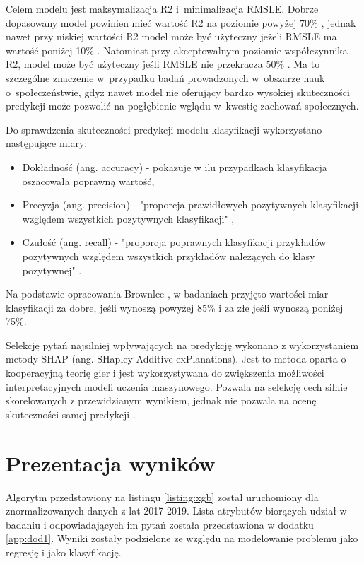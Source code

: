 Celem modelu jest maksymalizacja R2 i~minimalizacja RMSLE. Dobrze dopasowany model powinien mieć wartość R2 na poziomie powyżej 70\% \cite{r2-good-value}, jednak nawet przy niskiej wartości R2 model może być użyteczny jeżeli RMSLE ma wartość poniżej 10\% \cite{r2-vs-rmse}.
Natomiast przy akceptowalnym poziomie współczynnika R2, model może być użyteczny jeśli RMSLE nie przekracza 50\% \cite{rmse-good-value}.
Ma to szczególne znaczenie w~przypadku badań prowadzonych w~obszarze nauk o~społeczeństwie, gdyż nawet model nie oferujący bardzo wysokiej skuteczności predykcji może pozwolić na pogłębienie wglądu w~kwestię zachowań społecznych.

Do sprawdzenia skuteczności predykcji modelu klasyfikacji wykorzystano następujące miary:
\begin{itemize}
    \item Dokładność (ang. accuracy) - pokazuje w ilu przypadkach klasyfikacja oszacowała poprawną wartość,
    \item Precyzja (ang. precision) - "proporcja prawidłowych pozytywnych klasyfikacji względem wszystkich pozytywnych klasyfikacji" \cite{recall-precision},
    \item Czułość (ang. recall) - "proporcja poprawnych klasyfikacji przykładów pozytywnych względem wszystkich przykładów należących do klasy pozytywnej" \cite{recall-precision}.
\end{itemize}

Na podstawie opracowania Brownlee \cite{accuracy-level}, w badaniach przyjęto wartości miar klasyfikacji za dobre, jeśli wynoszą powyżej 85\% i za złe jeśli wynoszą poniżej 75\%.

Selekcję pytań najsilniej wpływających na predykcję wykonano z wykorzystaniem metody SHAP (ang. SHapley Additive exPlanations).
Jest to metoda oparta o kooperacyjną teorię gier i jest wykorzystywana do zwiększenia możliwości interpretacyjnych modeli uczenia maszynowego.
Pozwala na selekcję cech silnie skorelowanych z przewidzianym wynikiem, jednak nie pozwala na ocenę skuteczności samej predykcji \cite{shap}.


\section{Prezentacja wyników}\label{sec:analysis:important-features}

Algorytm przedstawiony na listingu \ref{listing:xgb} został uruchomiony dla znormalizowanych danych z lat 2017-2019.
Lista atrybutów biorących udział w badaniu i odpowiadających im pytań została przedstawiona w dodatku \ref{app:dod1}.
Wyniki zostały podzielone ze względu na modelowanie problemu jako regresję i jako klasyfikację.

